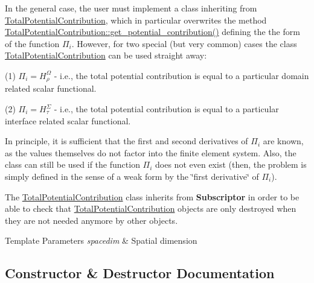 In the general case, the user must implement a class inheriting from \hyperlink{class_total_potential_contribution}{Total\+Potential\+Contribution}, which in particular overwrites the method \hyperlink{class_total_potential_contribution_a0d281fceeb90ece5c4d2655df5eb9948}{Total\+Potential\+Contribution\+::get\+\_\+potential\+\_\+contribution()} defining the the form of the function $\Pi_i$. However, for two special (but very common) cases the class \hyperlink{class_total_potential_contribution}{Total\+Potential\+Contribution} can be used straight away\+:

(1) $\Pi_i=H^\Omega_\rho$ -\/ i.\+e., the total potential contribution is equal to a particular domain related scalar functional.

(2) $\Pi_i=H^\Sigma_\tau$ -\/ i.\+e., the total potential contribution is equal to a particular interface related scalar functional.

In principle, it is sufficient that the first and second derivatives of $\Pi_i$ are known, as the values themselves do not factor into the finite element system. Also, the class can still be used if the function $\Pi_i$ does not even exist (then, the problem is simply defined in the sense of a weak form by the \char`\"{}first derivative\char`\"{} of $\Pi_i$).

The \hyperlink{class_total_potential_contribution}{Total\+Potential\+Contribution} class inherits from {\bf Subscriptor} in order to be able to check that \hyperlink{class_total_potential_contribution}{Total\+Potential\+Contribution} objects are only destroyed when they are not needed anymore by other objects.


\begin{DoxyTemplParams}{Template Parameters}
{\em spacedim} & Spatial dimension \\
\hline
\end{DoxyTemplParams}


\subsection{Constructor \& Destructor Documentation}
